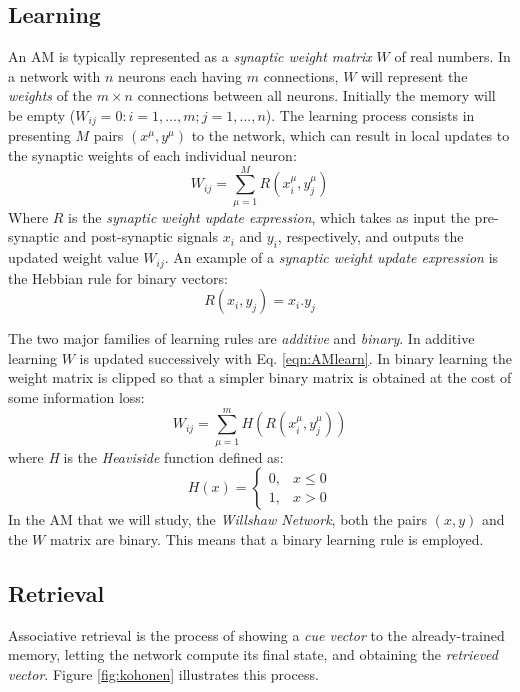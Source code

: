 \documentclass[runningheads]{llncs}
\begin{document}
\subsection{Learning}
\label{sec:assomem_learn}
An AM is typically represented as a \textit{synaptic weight matrix} $W$ of real numbers. In a network with $n$ neurons each having $m$ connections, $W$ will represent the \textit{weights} of the  $m \times n$ connections between all neurons. Initially the memory will be empty ($W_{ij} = 0 : i=1, \ldots, m ;  j=1, \ldots, n  $). The learning process consists in presenting $M$ pairs $\left(x^{\mu}, y^{\mu}\right)$ to the network, which can result in local updates to the synaptic weights of each individual neuron:
\begin{equation}
\label{eqn:AMlearn}
    W_{ij}=\sum_{\mu=1}^{M} R \left( x_{i}^{\mu} , y_{j}^{\mu}\right)
\end{equation}
Where $R$ is the\textit{ synaptic weight update expression}, which takes as input the pre-synaptic and post-synaptic signals $x_i$ and $y_i$, respectively, and outputs the updated weight value $W_{ij}$. An example of a \textit{ synaptic weight update expression} is the Hebbian rule \cite{hebb2005organization} for binary vectors:
\begin{equation}
\label{eqn:hebbian}
    R \left( x_i,y_j \right) = x_i . y_j
\end{equation}

The two major families of learning rules are \textit{additive} and \textit{binary}. In additive learning $W$ is updated successively with Eq. \ref{eqn:AMlearn}. In binary learning the weight matrix is clipped so that a simpler binary matrix is obtained at the cost of some information loss:
\begin{equation}
\label{eq:AM_learn_rule}
    W_{ij}=\sum_{\mu=1}^{m}H\left( R \left( x_{i}^{\mu}, y_{j}^{\mu}\right) \right)
\end{equation}
where \textit{H} is the \textit{Heaviside} function defined as:
\begin{equation}
    H(x)=\left\{\begin{array}{ll}
0, & x\leq 0 \\
1, & x > 0
\end{array}\right.
\label{eqn:heaviside}
\end{equation}
In the AM that we will study, the \textit{Willshaw Network}, both the pairs $(x,y)$ and the $W$ matrix are binary. This means that a binary learning rule is employed.

\subsection{Retrieval}
\label{sec:assomem_ret}
Associative retrieval is the process of showing a \textit{cue vector} to the already-trained memory, letting the network compute its final state, and obtaining the \textit{retrieved vector}. Figure \ref{fig:kohonen} illustrates this process. 
\end{document}
